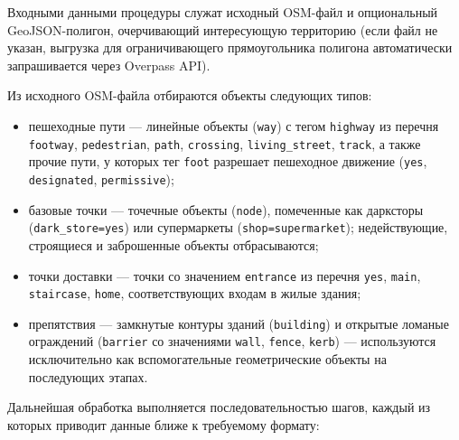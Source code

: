 Входными данными процедуры служат исходный OSM-файл и опциональный GeoJSON-полигон, очерчивающий 
интересующую территорию (если файл не указан, выгрузка для ограничивающего прямоугольника полигона 
автоматически запрашивается через Overpass API).

Из исходного OSM-файла отбираются объекты следующих типов:
\begin{itemize}
\item пешеходные пути --- линейные объекты (\texttt{way}) с тегом
      \texttt{highway} из перечня \texttt{footway}, \texttt{pedestrian},
      \texttt{path}, \texttt{crossing}, \texttt{living\_street},
      \texttt{track}, а также прочие пути, у которых тег \texttt{foot}
      разрешает пешеходное движение (\texttt{yes}, \texttt{designated},
      \texttt{permissive});
\item базовые точки --- точечные объекты (\texttt{node}), помеченные
      как дарксторы (\texttt{dark\_store=yes}) или супермаркеты
      (\texttt{shop=supermarket}); недействующие, строящиеся
      и заброшенные объекты отбрасываются;
\item точки доставки --- точки со значением \texttt{entrance} из
      перечня \texttt{yes}, \texttt{main}, \texttt{staircase}, \texttt{home},
      соответствующих входам в жилые здания;
\item препятствия --- замкнутые контуры зданий (\texttt{building}) и
      открытые ломаные ограждений (\texttt{barrier} со значениями \texttt{wall},
      \texttt{fence}, \texttt{kerb}) --- используются исключительно как
      вспомогательные геометрические объекты на последующих этапах.
\end{itemize}

Дальнейшая обработка выполняется последовательностью шагов, каждый из которых приводит данные ближе 
к требуемому формату:


